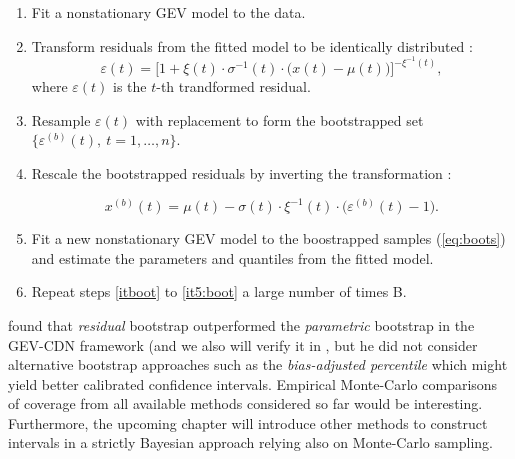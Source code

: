 \begin{enumerate}
	\item\label{itboot} Fit a nonstationary GEV model to the data.
	\item Transform residuals from the fitted model to be identically distributed :
	\begin{equation*}
	\varepsilon(t)=\bigg[1+\xi(t)\cdot\sigma^{-1}(t)\cdot\Big(x(t)-\mu(t)\Big)\bigg]^{-\xi^{-1}(t)},
	\end{equation*}
	where $\varepsilon(t)$ is the $t$-th trandformed residual.
	
	\item Resample $\varepsilon(t)$ with replacement to form the bootstrapped set $\Big\{\varepsilon^{(b)}(t), \ t=1,\ldots,n\Big\}$.
	
	\item Rescale the bootstrapped residuals by inverting the transformation : 
	
	\begin{equation}\label{eq:boots}
	x^{(b)}(t)=\mu(t)-\sigma(t)\cdot\xi^{-1}(t)\cdot\Big(\varepsilon^{(b)}(t)-1\Big).
	\end{equation}
	\item\label{it5:boot} Fit a new nonstationary GEV  model to the boostrapped samples (\ref{eq:boots}) and estimate the parameters and quantiles from the fitted model. 
	\item Repeat steps \ref{itboot} to \ref{it5:boot} a large number of times B.
	
\end{enumerate}
\citet{cannon_flexible_2010} found that \emph{residual} bootstrap outperformed the \emph{parametric} bootstrap in the GEV-CDN framework (and we also will verify it in , but he did not consider alternative bootstrap approaches such as the \emph{bias-adjusted percentile} which might yield better calibrated confidence intervals.
Empirical Monte-Carlo comparisons of coverage from all available methods considered so far would be interesting. Furthermore, the upcoming chapter will introduce other methods to construct intervals in a strictly Bayesian approach  relying also on Monte-Carlo sampling.
